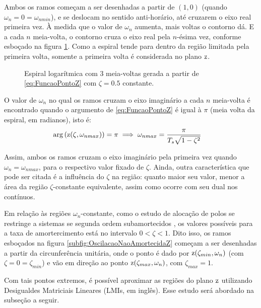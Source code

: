 Ambos os ramos começam a ser desenhadas a partir de $(1,0)$ (quando $\omega_n = 0 = \omega_{nmin}$), e se deslocam no sentido anti-horário, até cruzarem o eixo real primeira vez. À medida que o valor de $\omega_n$ aumenta, mais voltas o contorno dá. E a cada $n$ meia-volta, o contorno cruza o eixo real pela $n$-ésima vez, conforme esboçado na figura \ref{fig:EspiralLogaritmica}. Como a espiral tende para dentro da região limitada pela primeira volta, somente a primeira volta é considerada no plano $\operatorname{\mathrm{z}}$.

\begin{figure}[!ht]
  \centering
  
  \caption{Espiral logarítmica com 3 meia-voltas gerada a partir de \eqref{eq:FuncaoPontoZ} com $\zeta=0.5$ constante.}
  \label{fig:EspiralLogaritmica}
\end{figure}

O valor de $\omega_n$ no qual os ramos cruzam o eixo imaginário a cada $n$ meia-volta é encontrado quando o argumento de \eqref{eq:FuncaoPontoZ} é igual à $\pi$ (meia volta da espiral, em radianos), isto é:
\begin{align}
  \arg{\left(\operatorname{\mathrm{z}}(\zeta,\omega_{nmax})\right)} &= \pi \implies \omega_{nmax} = \dfrac{\pi}{T_s\sqrt{1-\zeta^2}}\label{eq:PontoExtremoZetaZ}
\end{align}

Assim, ambos os ramos cruzam o eixo imaginário pela primeira vez quando $\omega_n = \omega_{nmax}$, para o respectivo valor fixado de $\zeta$. Ainda, outra característica que pode ser citada é a influência do $\zeta$ na região: quanto maior seu valor, menor a área da região $\zeta$-constante equivalente, assim como ocorre com seu dual nos contínuos.

Em relação às regiões $\omega_n$-constante, como o estudo de alocação de polos se restringe a sistemas se segunda ordem subamortecidos \cite{NISE2011} \cite{OGATA2011}, os valores possíveis para a taxa de amortercimento está no intervalo $0 < \zeta < 1$. Dito isso, os ramos esboçados na figura \ref{subfig:OscilacaoNaoAmortecidaZ} começam a ser desenhadas a partir da circunferência unitária, onde o ponto é dado por $\operatorname{\mathrm{z}}(\zeta_{min},\omega_n)$ (com $\zeta = 0 = \zeta_{min}$) e vão em direção ao ponto $\operatorname{\mathrm{z}}(\zeta_{max},\omega_n)$, com $\zeta_{max} = 1$.

Com tais pontos extremos, é possível aproximar as regiões do plano $\operatorname{\mathrm{z}}$ utilizando Desigualdes Matriciais Lineares (LMIs, em inglês). Esse estudo será abordado na subseção a seguir.


